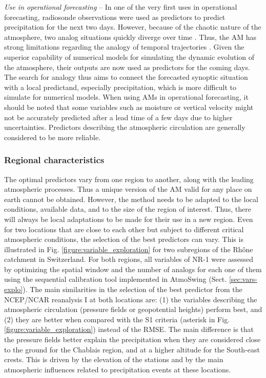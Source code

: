 \documentclass[gmdd]{copernicus}
\begin{document}
\textit{Use in operational forecasting} -- In one of the very first uses in operational forecasting, radiosonde observations were used as predictors to predict precipitation for the next two days. However, because of the chaotic nature of the atmosphere, two analog situations quickly diverge over time \citep{Lorenz1969}. Thus, the AM has strong limitations regarding the analogy of temporal trajectories \citep{Bontron2004}. Given the superior capability of numerical models for simulating the dynamic evolution of the atmosphere, their outputs are now used as predictors for the coming days. The search for analogy thus aims to connect the forecasted synoptic situation with a local predictand, especially precipitation, which is more difficult to simulate for numerical models. When using AMs in operational forecasting, it should be noted that some variables such as moisture or vertical velocity might not be accurately predicted after a lead time of a few days due to higher uncertainties. Predictors describing the atmospheric circulation are generally considered to be more reliable.


\subsubsection{Regional characteristics}

The optimal predictors vary from one region to another, along with the leading atmospheric processes. Thus a unique version of the AM valid for any place on earth cannot be obtained. However, the method needs to be adapted to the local conditions, available data, and to the size of the region of interest. Thus, there will always be local adaptations to be made for their use in a new region. Even for two locations that are close to each other but subject to different critical atmospheric conditions, the selection of the best predictors can vary. This is illustrated in Fig. \ref{figure:variable_exploration} for two subregions of the Rh\^{o}ne catchment in Switzerland. For both regions, all variables of NR-1 were assessed by optimizing the spatial window and the number of analogs for each one of them using the sequential calibration tool implemented in AtmoSwing (Sect. \ref{sec:vars-explo}). The main similarities in the selection of the best predictor from the NCEP/NCAR reanalysis I at both locations are: (1) the variables describing the atmospheric circulation (pressure fields or geopotential heights) perform best, and (2) they are better when compared with the S1 criteria (asterisk in Fig. \ref{figure:variable_exploration}) instead of the RMSE. The main difference is that the pressure fields better explain the precipitation when they are considered close to the ground for the Chablais region, and at a higher altitude for the South-east crests. This is driven by the elevation of the stations and by the main atmospheric influences related to precipitation events at these locations. 
\end{document}
